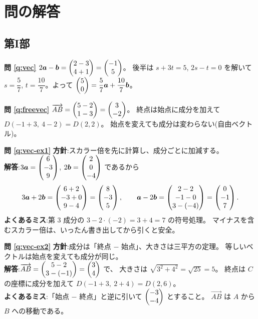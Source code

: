 \chapter*{問の解答}

\section*{第I部}

\noindent\textbf{問 \ref{q:vec}}\quad
$2\bm{a} - \bm{b} = \begin{pmatrix}2 - 3 \\ 4 + 1\end{pmatrix} = \begin{pmatrix}-1 \\ 5\end{pmatrix}$。
後半は $s + 3t = 5$, $2s - t = 0$ を解いて $s = \dfrac{5}{7}$,
$t = \dfrac{10}{7}$。よって
$\begin{pmatrix}5 \\ 0\end{pmatrix} = \dfrac{5}{7}\bm{a} + \dfrac{10}{7}\bm{b}$。

\bigskip
\noindent\textbf{問 \ref{q:freevec}}\quad
$\overrightarrow{AB} = \begin{pmatrix}5 - 2 \\ 1 - 3\end{pmatrix} = \begin{pmatrix}3 \\ -2\end{pmatrix}$。
終点は始点に成分を加えて $D(-1 + 3,\ 4 - 2) = D(2, 2)$。
始点を変えても成分は変わらない(自由ベクトル)。

\bigskip
\noindent\textbf{問 \ref{q:vec-ex1}}\quad
\textbf{方針}:スカラー倍を先に計算し、成分ごとに加減する。\\
\textbf{解答}:$3\bm{a} = \begin{pmatrix}6 \\ -3 \\ 9\end{pmatrix}$,
$2\bm{b} = \begin{pmatrix}2 \\ 0 \\ -4\end{pmatrix}$ であるから
\[
3\bm{a} + 2\bm{b} = \begin{pmatrix}6 + 2 \\ -3 + 0 \\ 9 - 4\end{pmatrix} = \begin{pmatrix}8 \\ -3 \\ 5\end{pmatrix},
\qquad
\bm{a} - 2\bm{b} = \begin{pmatrix}2 - 2 \\ -1 - 0 \\ 3 - (-4)\end{pmatrix} = \begin{pmatrix}0 \\ -1 \\ 7\end{pmatrix}.
\]
\textbf{よくあるミス}:第 $3$ 成分の $3 - 2 \cdot (-2) = 3 + 4 = 7$ の符号処理。
マイナスを含むスカラー倍は、いったん書き出してから引くと安全。

\bigskip
\noindent\textbf{問 \ref{q:vec-ex2}}\quad
\textbf{方針}:成分は「終点 $-$ 始点」、大きさは三平方の定理。
等しいベクトルは始点を変えても成分が同じ。\\
\textbf{解答}:$\overrightarrow{AB} = \begin{pmatrix}5 - 2 \\ 3 - (-1)\end{pmatrix} = \begin{pmatrix}3 \\ 4\end{pmatrix}$ で、
大きさは $\sqrt{3^2 + 4^2} = \sqrt{25} = 5$。
終点は $C$ の座標に成分を加えて $D(-1 + 3,\ 2 + 4) = D(2, 6)$。\\
\textbf{よくあるミス}:「始点 $-$ 終点」と逆に引いて $\begin{pmatrix}-3 \\ -4\end{pmatrix}$ とすること。
$\overrightarrow{AB}$ は $A$ から $B$ への移動である。

